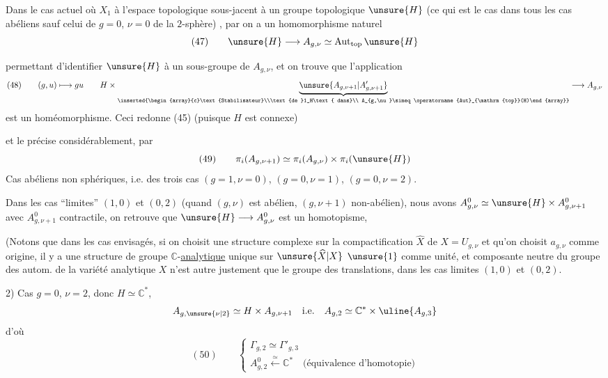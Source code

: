 Dans le cas actuel où  $X_1$   à l'espace topologique sous-jacent à un groupe topologique $\unsure{H}$ (ce qui est le cas dans tous les cas abéliens sauf celui de $g=0$, $\nu=0$ de la $2$-sphère) , par  on a un homomorphisme naturel
\[
(47)\qquad\unsure{H}\longrightarrow A_{g,\nu}\simeq\operatorname{Aut}_{\mathrm{top}}\unsure{H}
\]

permettant d'identifier $\unsure{H}$ à un sous-groupe  de $A_{g,\nu}$, et on trouve que l'application
\[
(48)\qquad (g,u)\longmapsto gu\qquad
H\times\underbrace{\unsure{A_{g,\nu+1}|A'_{g,\nu+1}}}_{\inserted{\begin{array}{c}\text{Stabilisateur}\\\text{de }1_H\text{ dans}\\ A_{g,\nu}\simeq\operatorname{Aut}_{\mathrm{top}}(H)\end{array}}}
\longrightarrow A_{g,\nu}
\]
est un homéomorphisme.  Ceci  redonne (45) (puisque $H$ est connexe)

et le précise considérablement, par
\[
(49)\qquad\pi_i(A_{g,\nu+1})\simeq\pi_i(A_{g,\nu})\times\pi_i(\unsure{H})
\]
Cas abéliens non sphériques, i.e.  des trois cas $(g=1,\nu=0)$, $(g=0,\nu=1)$, $(g=0,\nu=2)$.

Dans les cas ``limites'' $(1,0)$ et $(0,2)$ (quand $(g,\nu)$ est abélien, $(g,\nu+1)$ non-abélien), nous avons $A^0_{g,\nu}\simeq\unsure{H}\times A^0_{g,\nu+1}$ avec $A^0_{g,\nu+1}$ contractile, on retrouve que $\unsure{H}\longrightarrow A^0_{g,\nu}$ est un homotopisme, 

(Notons que dans les cas envisagés, si on choisit une structure complexe sur la compactification $\widehat X$ de $X=U_{g,\nu}$ et qu'on choisit $a_{g,\nu}$ comme origine, il y a une structure de groupe $\mathbb{C}$-\uline{analytique} unique sur $\unsure{\widehat X|X}$  $\unsure{1}$ comme unité, et    composante neutre du groupe des autom. de la variété analytique $X$ n'est autre justement que le groupe des translations, dans les cas limites $(1,0)$ et $(0,2)$.

2) Cas $g=0$, $\nu=2$, donc $H\simeq\mathbb{C}^*$,
\[
A_{g,\unsure{\nu|2}}\simeq H\times A_{g,\nu+1}\quad\text{i.e.}\quad A_{g,2}\simeq\mathbb{C}^*\times\uline{A_{g,3}}
\]
d'où
\[
(50)\qquad\left\{\begin{array}{l}
\Gamma_{g,2}\simeq\Gamma'_{g,3}\\
A^0_{g,2}\xleftarrow{\simeq}\mathbb{C}^*\quad\text{(équivalence d'homotopie)}
\end{array}\right.
\]

